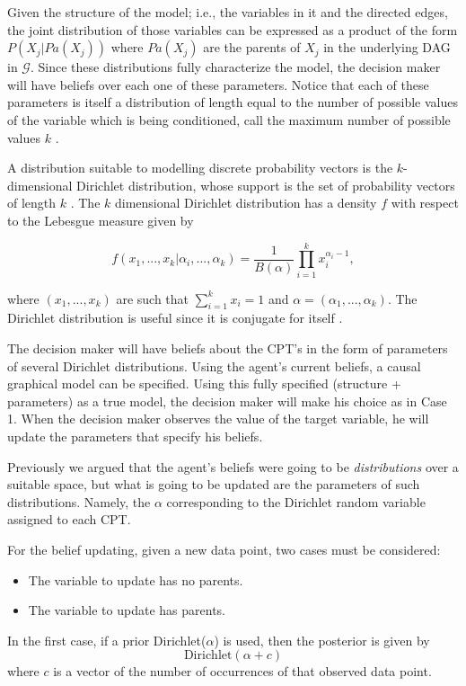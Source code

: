 \documentclass[english,letterpaper,12pt,final]{article}
\theoremstyle{definition}
\begin{document}
Given the structure of the model; i.e., the variables in it and the directed edges, the joint distribution of those variables can be expressed as a product of the form $P(X_j | Pa(X_j))$ where $Pa(X_j)$ are the parents of $X_j$ in the underlying DAG in $\mathcal{G}$. Since these distributions fully characterize the model, the decision maker will have beliefs over each one of these parameters. Notice that each of these parameters is itself a distribution of length equal to the number of possible values of the variable which is being conditioned, call the maximum number of possible values $k$ . 

A distribution suitable to modelling discrete probability vectors is the $k$-dimensional Dirichlet distribution, whose support is the set of probability vectors of length $k$ \cite{hjort2010bayesian}. The $k$ dimensional Dirichlet distribution has a density $f$ with respect to the Lebesgue measure given by

\[ f(x_1,...,x_k | \alpha_i,...,\alpha_k)=\frac{1}{B(\alpha)}  \prod_{i=1}^k x_i^{\alpha_i-1},\]

where $(x_1,...,x_k)$ are such that $\sum_{i=1}^k x_i =1$ and $\alpha=(\alpha_1,...,\alpha_k)$. The Dirichlet distribution is useful since it is conjugate for itself \cite{bernardo2000bayesian}.

The decision maker will have beliefs about the CPT's in the form of parameters of several Dirichlet distributions. Using the agent's current beliefs, a causal graphical model can be specified. Using this fully specified (structure + parameters) as a true model, the decision maker will make his choice as in Case 1. When the decision maker observes the value of the target variable, he will update the parameters that specify his beliefs.

Previously we argued that the agent's beliefs were going to be \textit{distributions} over a suitable space, but what is going to be updated are the parameters of such distributions. Namely, the $\alpha$ corresponding to the Dirichlet random variable assigned to each CPT.

For the belief updating, given a new data point,  two cases must be considered:
\begin{itemize}
\item The variable to update has no parents.
\item The variable to update has parents.
\end{itemize}

In the first case, if a prior Dirichlet($\alpha$) is used, then the posterior is given by
\[ \textrm{Dirichlet}(\alpha + c) \]
where $c$ is a vector of the number of occurrences of that observed data point. 
\end{document}
